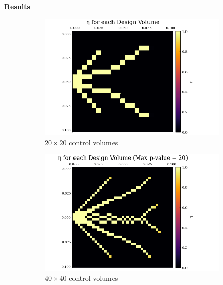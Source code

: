 \documentclass[final]{beamer}
\begin{document}
\begin{frame}{\textbf{Results}}
	\begin{figure}
		\begin{subfigure}{0.4\textwidth}
			\centering
			\includegraphics[width=1.1\linewidth]{20x20-Final_Design.png}
			\caption{$20\times 20$ control volumes}
			\label{fig:SIMP-Output-20}
		\end{subfigure}
		\begin{subfigure}{0.4\textwidth}
			\centering
			\includegraphics[width=1.1\linewidth]{40x40-Final_Design.png}
			\caption{$40\times 40$ control volumes}
			\label{fig:SIMP-Output-40}
		\end{subfigure}
		\begin{center}
			\begin{subfigure}{0.5\textwidth}
				\centering

\end{subfigure}
\end{center}
\end{figure}
\end{frame}
\end{document}
